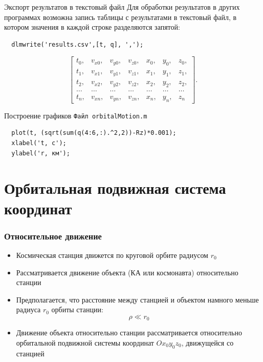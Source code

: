 \documentclass[12pt, compress]{beamer}
\newcommand{\matcode}[1]{ \textcolor{codecolor}{\texttt{#1}}}
\renewcommand{\emph}[1]{\textcolor{dark-blue}{#1}}
\begin{document}
\begin{frame}[fragile]{Экспорт результатов в текстовый файл}
Для обработки результатов в других программах возможна запись таблицы с результатами в текстовый файл, в котором значения в каждой строке разделяются запятой:
\begin{lstlisting}  
  dlmwrite('results.csv',[t, q], ',');
\end{lstlisting}
$$
\begin{bmatrix} 
  t_0, & v_{x0}, & v_{y0}, & v_{z0}, & x_{0}, & y_{0}, & z_{0}, \\
  t_1, & v_{x1}, & v_{y1}, & v_{z1}, & x_{1}, & y_{1}, & z_{1}, \\
  t_2, & v_{x2}, & v_{y2}, & v_{z2}, & x_{2}, & y_{2}, & z_{2}, \\
  \ldots & \ldots & \ldots & \ldots & \ldots & \ldots & \ldots \\
  t_n, & v_{xn}, & v_{yn}, & v_{zn}, & x_{n}, & y_{n}, & z_{n} 
\end{bmatrix}.
$$
\end{frame}


\begin{frame}[fragile]{Построение графиков}
\matcode{Файл orbitalMotion.m}
\begin{lstlisting}
  plot(t, (sqrt(sum(q(4:6,:).^2,2))-Rz)*0.001);
  xlabel('t, c');
  ylabel('r, км');
\end{lstlisting}

\end{frame}




\section{Орбитальная подвижная система координат} 

\begin{frame}[c]
\frametitle{Относительное движение}
\begin{itemize}
	\item Космическая станция движется по круговой орбите радиусом $r_0$
	\item Рассматривается движение объекта (КА или космонавта) относительно станции
	\item Предполагается, что расстояние между станцией и объектом намного меньше радиуса $r_0$ орбиты станции:
	$$
		\rho \ll r_0
	$$
	\item Движение объекта относительно станции рассматривается относительно орбитальной подвижной системы координат $Ox_0y_0z_0$, \emph{движущейся со станцией}
\end{itemize}
\end{frame}
 
\end{document}
